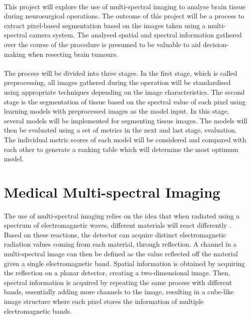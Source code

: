 \documentclass[12pt]{article}
\begin{document}
    \paragraph{}
    This project will explore the use of multi-spectral imaging to analyse brain tissue during neurosurgical operations. The outcome of this project will be a process to extract pixel-based segmentation based on the images taken using a multi-spectral camera system. The analysed spatial and spectral information gathered over the course of the procedure is presumed to be valuable to aid decision-making when resecting brain tumours.

    \paragraph{}
    The process will be divided into three stages. In the first stage, which is called preprocessing, all images gathered during the operation will be standardised using appropriate techniques depending on the image characteristics. The second stage is the segmentation of tissue based on the spectral value of each pixel using learning models with preprocessed images as the model input. In this stage, several models will be implemented for segmenting tissue images. The models will then be evaluated using a set of metrics in the next and last stage, evaluation. The individual metric scores of each model will be considered and compared with each other to generate a ranking table which will determine the most optimum model.


\section{Medical Multi-spectral Imaging}
    \paragraph{}
    The use of multi-spectral imaging relies on the idea that when radiated using a spectrum of electromagnetic waves, different materials will react differently \cite{wu_review_2022}. Based on these reactions, the detector can acquire distinct electromagnetic radiation values coming from each material, through reflection. A channel in a multi-spectral image can then be defined as the value reflected off the material given a single electromagnetic band. Spatial information is obtained by acquiring the reflection on a planar detector, creating a two-dimensional image. Then, spectral information is acquired by repeating the same process with different bands, essentially adding more channels to the image, resulting in a cube-like image structure where each pixel stores the information of multiple electromagnetic bands.
\end{document}
